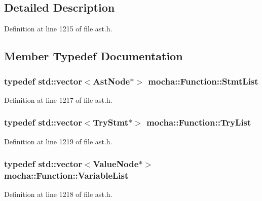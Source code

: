\subsection{Detailed Description}


Definition at line 1215 of file ast.h.



\subsection{Member Typedef Documentation}
\hypertarget{classmocha_1_1_function_a5c4a48ede908b355b4f13a8f1d585707}{
\subsubsection[{StmtList}]{\setlength{\rightskip}{0pt plus 5cm}typedef std::vector$<${\bf AstNode}$\ast$$>$ {\bf mocha::Function::StmtList}}}
\label{classmocha_1_1_function_a5c4a48ede908b355b4f13a8f1d585707}


Definition at line 1217 of file ast.h.

\hypertarget{classmocha_1_1_function_a9991b3d8362e4a8889c4b50d930d88ce}{
\subsubsection[{TryList}]{\setlength{\rightskip}{0pt plus 5cm}typedef std::vector$<${\bf TryStmt}$\ast$$>$ {\bf mocha::Function::TryList}}}
\label{classmocha_1_1_function_a9991b3d8362e4a8889c4b50d930d88ce}


Definition at line 1219 of file ast.h.

\hypertarget{classmocha_1_1_function_a243702678d29f0cfd91913838c1fb38c}{
\subsubsection[{VariableList}]{\setlength{\rightskip}{0pt plus 5cm}typedef std::vector$<${\bf ValueNode}$\ast$$>$ {\bf mocha::Function::VariableList}}}
\label{classmocha_1_1_function_a243702678d29f0cfd91913838c1fb38c}


Definition at line 1218 of file ast.h.



